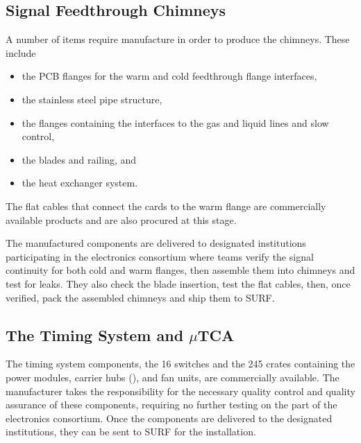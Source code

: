 \subsection{Signal Feedthrough Chimneys}
\label{sec:fddp-tpc-elec-prod-sft}
A number of items require manufacture in order to produce the  chimneys. These include 
\begin{itemize}
\item the PCB flanges for the warm and cold feedthrough flange interfaces, 
\item the stainless steel pipe structure, 
\item the flanges containing the interfaces to the gas and liquid lines and slow control, 
\item the blades and railing, and 
\item the heat exchanger system. 
\end{itemize}
The flat cables that connect the  cards to the warm flange are commercially available products and are also procured at this stage. 

The %
manufactured components are delivered to %
designated institutions participating in the \dual electronics consortium where teams verify the signal continuity %
for both cold and warm flanges, then assemble them into  chimneys and test for leaks. %
They also check the blade insertion, %
 test the flat cables,  %
 then, once verified, pack the assembled  chimneys %
 and ship them to SURF. 

\subsection{The Timing System and $\mu$TCA}
\label{sec:fddp-tpc-elec-prod-utca}

The timing system components, the  \num{16}  switches and the \num{245}  crates containing the power modules, carrier hubs (), and fan units,  %
are commercially available. The manufacturer takes the responsibility for the necessary quality control and quality assurance of these components, requiring no further testing on the part of the \dual electronics consortium. Once the components are delivered to the designated institutions, they can be sent to SURF for the installation. 

